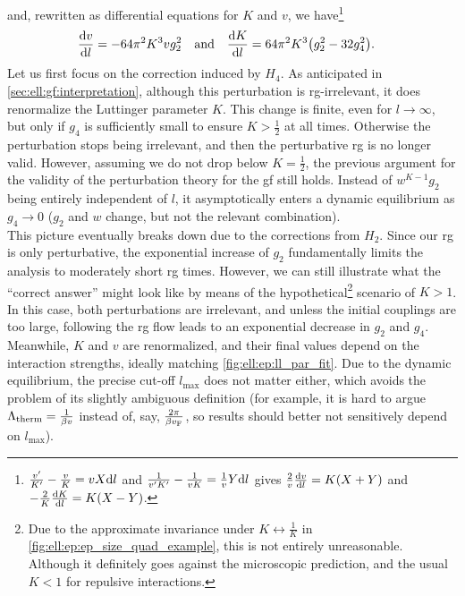 and, rewritten as differential equations for $K$ and $v$, we have\footnote{$\frac{v'}{K'} - \frac{v}{K} = vX\text{d} l$ and $\frac{1}{v'K'} - \frac{1}{vK} = \frac{1}{v} Y\text{d} l$ gives $\frac{2}{v} \frac{\text{d} v}{\text{d} l} = K(X+Y)$ and $-\frac{2}{K} \frac{\text{d} K}{\text{d} l} = K(X-Y)$.}
\begin{align*}
\frac{\d v}{\d l} &= -64\pi^2 K^3 v g_2^2 \quad \text{and} \quad
\frac{\d K}{\d l} = 64\pi^2 K^3 \kla*{ g_2^2 - 32 g_4^2}.
\end{align*}
Let us first focus on the correction induced by $H_4$.
As anticipated in \autoref{sec:ell:gf:interpretation}, although this perturbation is \gls{rg}-irrelevant, it does renormalize the Luttinger parameter $K$.
This change is finite, even for $l\rightarrow \infty$, but only if $g_4$ is sufficiently small to ensure $K>\frac{1}{2}$ at all times.
Otherwise the perturbation stops being irrelevant, and then the perturbative \gls{rg} is no longer valid.
However, assuming we do not drop below $K=\frac{1}{2}$, the previous argument for the validity of the perturbation theory for the \gls{gf} still holds.
Instead of $w^{K-1}g_2$ being entirely independent of $l$, it asymptotically enters a dynamic equilibrium as $g_4\rightarrow 0$ ($g_2$ and $w$ change, but not the relevant combination).\\
This picture eventually breaks down due to the corrections from $H_2$.
Since our \gls{rg} is only perturbative, the exponential increase of $g_2$ fundamentally limits the analysis to moderately short \gls{rg} times.
However, we can still illustrate what the ``correct answer'' might look like by means of the hypothetical\footnote{Due to the approximate invariance under $K\leftrightarrow \frac{1}{K}$ in \autoref{fig:ell:ep:ep_size_quad_example}, this is not entirely unreasonable.
Although it definitely goes against the microscopic prediction, and the usual $K<1$ for repulsive interactions.} scenario of $K>1$.
In this case, both perturbations are irrelevant, and unless the initial couplings are too large, following the \gls{rg} flow leads to an exponential decrease in $g_2$ and $g_4$.
Meanwhile, $K$ and $v$ are renormalized, and their final values depend on the interaction strengths, ideally matching \autoref{fig:ell:ep:ll_par_fit}.
Due to the dynamic equilibrium, the precise cut-off $l_\text{max}$ does not matter either, which avoids the problem of its slightly ambiguous definition (for example, it is hard to argue $\Lambda_{\text{therm}} = \frac{1}{\beta v}$ instead of, say, $\frac{2\pi}{\beta v_{\text{F}}}$, so results should better not sensitively depend on $l_\text{max}$).
